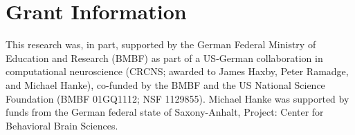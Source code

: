 \section*{Grant Information}
This research was, in part, supported by the German Federal Ministry of Education and Research (BMBF) as part of a US-German collaboration in computational neuroscience (CRCNS; awarded to James Haxby, Peter Ramadge, and Michael Hanke), co-funded by the BMBF and the US National Science Foundation (BMBF 01GQ1112; NSF 1129855). Michael Hanke was supported by funds from the German federal state of Saxony-Anhalt, Project: Center for Behavioral Brain Sciences.
